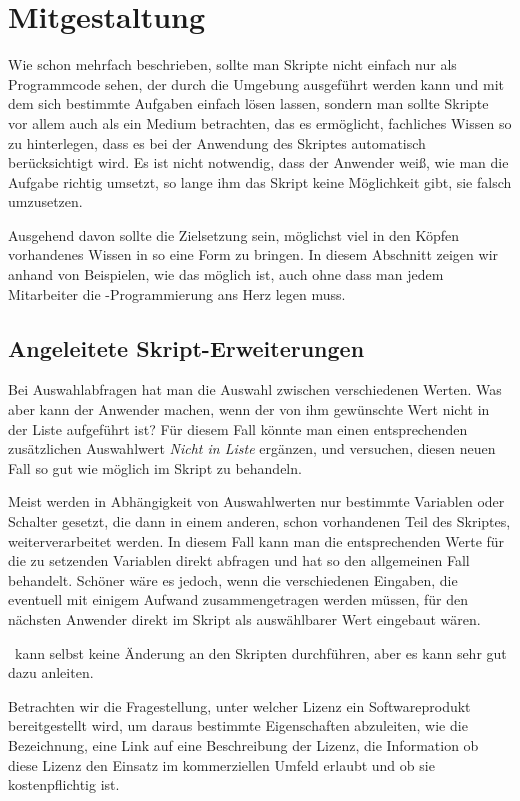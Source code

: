 \chapter{Mitgestaltung}
Wie schon mehrfach beschrieben, sollte man Skripte nicht einfach nur als Programmcode sehen, der durch die Umgebung ausgeführt werden kann und mit dem sich bestimmte Aufgaben einfach lösen lassen, sondern man sollte Skripte vor allem auch als ein Medium betrachten, das es ermöglicht, fachliches Wissen so zu hinterlegen, dass es bei der Anwendung des Skriptes automatisch berücksichtigt wird. Es ist nicht notwendig, dass der Anwender weiß, wie man die Aufgabe richtig umsetzt, so lange ihm das Skript keine Möglichkeit gibt, sie falsch umzusetzen.

Ausgehend davon sollte die Zielsetzung sein, möglichst viel in den Köpfen vorhandenes Wissen in so eine Form zu bringen. In diesem Abschnitt zeigen wir anhand von Beispielen, wie das möglich ist, auch ohne dass man jedem Mitarbeiter die \FPZb-Programmierung ans Herz legen muss.

\section{Angeleitete Skript-Erweiterungen}\label{AngeleiteteSkriptErweiterungen}
Bei Auswahlabfragen hat man die Auswahl zwischen verschiedenen Werten. Was aber kann der Anwender machen, wenn der von ihm gewünschte Wert nicht in der Liste aufgeführt ist? Für diesem Fall könnte man einen entsprechenden zusätzlichen Auswahlwert \emph{Nicht in Liste} ergänzen, und versuchen, diesen neuen Fall so gut wie möglich im Skript zu behandeln. 

Meist werden in Abhängigkeit von Auswahlwerten nur bestimmte Variablen oder Schalter gesetzt, die dann in einem anderen, schon vorhandenen Teil des Skriptes, weiterverarbeitet werden. In diesem Fall kann man die entsprechenden Werte für die zu setzenden Variablen direkt abfragen und hat so den allgemeinen Fall behandelt. Schöner wäre es jedoch, wenn die verschiedenen Eingaben, die eventuell mit einigem Aufwand zusammengetragen werden müssen, für den nächsten Anwender direkt im Skript als auswählbarer Wert eingebaut wären.

\FPZ\ kann selbst keine Änderung an den Skripten durchführen, aber es kann sehr gut dazu anleiten.

Betrachten wir die Fragestellung, unter welcher Lizenz ein Softwareprodukt bereitgestellt wird, um daraus bestimmte Eigenschaften abzuleiten, wie die Bezeichnung, eine Link auf eine Beschreibung der Lizenz, die Information ob diese Lizenz den Einsatz im kommerziellen Umfeld erlaubt und ob sie kostenpflichtig ist.

